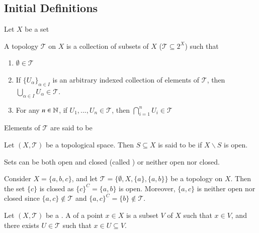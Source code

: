 \documentclass[12pt, a4paper, oneside, openright, titlepage]{book}
\begin{document}
\subsection{Initial Definitions}

Let $X$ be a set

\begin{definition}
    A topology $\mathcal{T}$ on $X$ is a collection of subsets of $X$ ($\mathcal{T} \subseteq 2^X$) such that \begin{enumerate}
        \item $\emptyset \in \mathcal{T}$
        \item If $\{U_{\alpha}\}_{\alpha \in I}$ is an arbitrary indexed collection of elements of $\mathcal{T}$, then $\bigcup_{\alpha \in I}U_\alpha \in \mathcal{T}$.
        \item For any $n \in \mathbb N$, if $U_1,...,U_n \in \mathcal{T}$, then $\bigcap\limits_{i=1}^nU_i \in \mathcal{T}$
    \end{enumerate}
    Elements of $\mathcal{T}$ are said to be 
\end{definition}

\begin{remark}
    Let $(X,\mathcal{T})$ be a topological space. Then $S\subseteq X$ is said to be  if $X\backslash S$ is open. 
\end{remark}

\begin{remark}[Fact]
    Sets can be both open and closed (called ) or neither open nor closed.
\end{remark}

\begin{example}
    Consider $X = \{a,b,c\}$, and let $\mathcal{T} = \{\emptyset, X, \{a\}, \{a,b\}\}$ be a topology on $X$. Then the set $\{c\}$ is closed as $\{c\}^C = \{a,b\}$ is open. Moreover, $\{a,c\}$ is neither open nor closed since $\{a,c\} \notin \mathcal{T}$ and $\{a,c\}^C = \{b\} \notin \mathcal{T}$.
\end{example}


\begin{definition}
    Let $(X,\mathcal{T})$ be a . A  of a point $x \in X$ is a subset $V$ of $X$ such that $x \in V$, and there exists $U \in \mathcal{T}$ such that $x \in U \subseteq V$. 
\end{definition}
\end{document}
